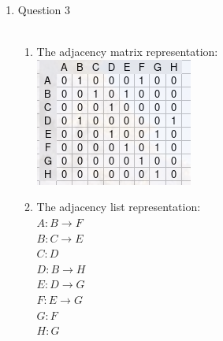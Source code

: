 \documentclass{article}
\begin{document}
\begin{enumerate}
\begin{enumerate}
\begin{proof}
      \end{proof}
    \item Claim: any connected undirected graph has $|E|\geq(|V|-1)$
    \begin{proof}
    For a graph to be connected, each vertex must have least one edge. However two vertices can share an
      edge. So between two vertices, there could be one edge. If every vertex only had one edge, the graph 
      would not be connected. So there must be at least one pair of vertices that are connected by a 
      common edge ($|V| - 1$). Therefore, there must be at least as many edges as there are vertices, less the 
      (minimum) one shared edge.
    \end{proof}

      \end{enumerate}

\item Question 3\\\\
  \begin{enumerate}
  \item The adjacency matrix representation:\\
  \includegraphics[scale=1]{adjmatrix.png}
  
  \item The adjacency list representation:\\
    $A: B \to F$\\
    $B: C \to E$\\
    $C: D$\\
    $D: B \to H$\\
    $E: D \to G$\\
    $F: E \to G$\\
    $G: F$\\
    $H: G$
    

\end{enumerate}
\end{enumerate}
\end{document}
